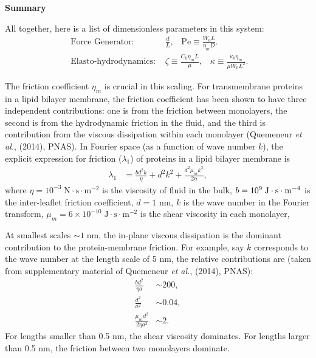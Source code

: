 \documentclass[11pt]{article}
\begin{document}
\noindent
{\bf Summary}

All together, here is a list of dimensionless parameters in this system:
\begin{align*}
\mbox{ Force Generator: }& \frac{d}{L}, \;\;\;\mbox{Pe} \equiv \frac{W_0 L}{\eta_m D}.\\
\mbox{ Elasto-hydrodynamics: }& \zeta \equiv \frac{C_0\eta_m L}{\mu},\;\;\; \kappa \equiv \frac{\kappa_b \eta_m}{\mu W_0 L^2}.
\end{align*}

The friction coefficient $\eta_m$ is crucial in this scaling. For transmembrane proteins in a lipid bilayer membrane, the friction coefficient has been shown to have three independent contributions: one is from the friction between monolayers, the second is from the hydrodynamic friction in the fluid, and the third is contribution from the viscous dissipation within each monolayer (Quemeneur {\it et al.}, (2014), PNAS). In Fourier space (as a function of wave number $k$), 
the explicit expression for friction ($\lambda_1$) of proteins in a 
lipid bilayer membrane is
\begin{align*}
\lambda_1 &= \frac{b d^2 k}{\eta} + d^2 k^2 + \frac{d^2 \mu_m k^3}{2 \eta},
\end{align*}
where $\eta = 10^{-3} \;\mbox{N}\cdot\mbox{s}\cdot\mbox{m}^{-2}$ is the viscosity of fluid in the bulk, $b=10^9 \; {\mbox J}\cdot{\mbox s}\cdot{\mbox m}^{-4}$  is the inter-leaflet friction coefficient,  $d=1$ nm,  $k$ is the wave number in the Fourier transform,  $\mu_m=6\times 10^{-10}\;\mbox{J}\cdot\mbox{s}\cdot\mbox{m}^{-2}$  is the shear viscosity in each monolayer, 

At smallest scales $\sim 1\;\mbox{nm}$, the in-plane viscous dissipation is the dominant contribution to the protein-membrane friction. For example, say $k$ corresponds to the wave number at the length scale of 5 nm,  the relative contributions are (taken from supplementary material of Quemeneur {\it et al.}, (2014), PNAS):
\begin{align*} 
\frac{bd^2}{\eta a} &\sim 200,\\
\frac{d^2}{a^2} &\sim 0.04,\\
\frac{\mu_m d^2}{2 \eta a^3} &\sim 2.
\end{align*}
For lengths smaller than 0.5 nm, the shear viscosity dominates. For lengths larger than 0.5 nm, the friction between two monolayers dominate.
%
\end{document}
